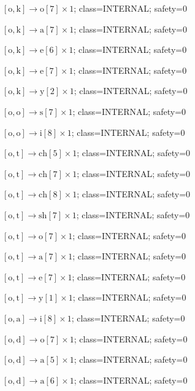 \(\left[\mathrm{o}, \mathrm{k}\right] \to \mathrm{o}[7] \times 1\); class=INTERNAL; safety=0\par
\(\left[\mathrm{o}, \mathrm{k}\right] \to \mathrm{a}[7] \times 1\); class=INTERNAL; safety=0\par
\(\left[\mathrm{o}, \mathrm{k}\right] \to \mathrm{e}[6] \times 1\); class=INTERNAL; safety=0\par
\(\left[\mathrm{o}, \mathrm{k}\right] \to \mathrm{e}[7] \times 1\); class=INTERNAL; safety=0\par
\(\left[\mathrm{o}, \mathrm{k}\right] \to \mathrm{y}[2] \times 1\); class=INTERNAL; safety=0\par
\(\left[\mathrm{o}, \mathrm{o}\right] \to \mathrm{s}[7] \times 1\); class=INTERNAL; safety=0\par
\(\left[\mathrm{o}, \mathrm{o}\right] \to \mathrm{i}[8] \times 1\); class=INTERNAL; safety=0\par
\(\left[\mathrm{o}, \mathrm{t}\right] \to \mathrm{ch}[5] \times 1\); class=INTERNAL; safety=0\par
\(\left[\mathrm{o}, \mathrm{t}\right] \to \mathrm{ch}[7] \times 1\); class=INTERNAL; safety=0\par
\(\left[\mathrm{o}, \mathrm{t}\right] \to \mathrm{ch}[8] \times 1\); class=INTERNAL; safety=0\par
\(\left[\mathrm{o}, \mathrm{t}\right] \to \mathrm{sh}[7] \times 1\); class=INTERNAL; safety=0\par
\(\left[\mathrm{o}, \mathrm{t}\right] \to \mathrm{o}[7] \times 1\); class=INTERNAL; safety=0\par
\(\left[\mathrm{o}, \mathrm{t}\right] \to \mathrm{a}[7] \times 1\); class=INTERNAL; safety=0\par
\(\left[\mathrm{o}, \mathrm{t}\right] \to \mathrm{e}[7] \times 1\); class=INTERNAL; safety=0\par
\(\left[\mathrm{o}, \mathrm{t}\right] \to \mathrm{y}[1] \times 1\); class=INTERNAL; safety=0\par
\(\left[\mathrm{o}, \mathrm{a}\right] \to \mathrm{i}[8] \times 1\); class=INTERNAL; safety=0\par
\(\left[\mathrm{o}, \mathrm{d}\right] \to \mathrm{o}[7] \times 1\); class=INTERNAL; safety=0\par
\(\left[\mathrm{o}, \mathrm{d}\right] \to \mathrm{a}[5] \times 1\); class=INTERNAL; safety=0\par
\(\left[\mathrm{o}, \mathrm{d}\right] \to \mathrm{a}[6] \times 1\); class=INTERNAL; safety=0\par
